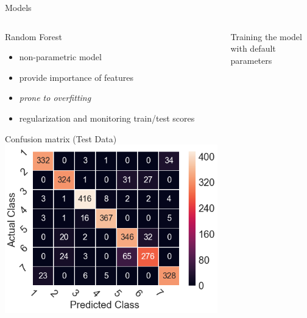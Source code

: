 \documentclass{if-beamer}
\begin{document}
 
\begin{frame}{Models}
\begin{columns}

 \begin{column}{0.5\textwidth}
    \begin{block}{Random Forest}
        \begin{itemize}
         \item non-parametric model
          \item provide importance of features
         \item \emph{prone to overfitting} 
           \item regularization and monitoring train/test scores
        \end{itemize}
   \end{block} 
    \begin{exampleblock}{Confusion matrix (Test Data)}
      \includegraphics[scale=0.2]{./figs/rf_cm_default_X34.png}
      \end{exampleblock}
 \end{column}
  
\begin{column}{0.5\textwidth}


    Training the model with default parameters 
    

\end{column}
\end{columns}
\end{frame}
\end{document}

